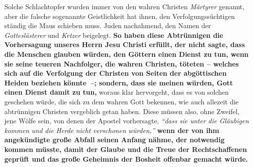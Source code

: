 Solche Schlachtopfer wurden immer von den wahren Christen
\textit{Märtyrer} genannt,
aber die falsche sogenannte Geistlichkeit
hat ihnen, den Verfolgungssüchtigen
ständig die Maus schieben muss.
Juden nachahmend, den Namen der
\textit{Gotteslästerer} und
\textit{Ketzer} beigelegt.  \label{ref:07_16_vervolgung}
\textbf{So haben diese Abtrünnigen die Vorhersagung
unseres Herrn Jesu Christi erfüllt, der nicht sagte, dass die Menschen glauben
würden, den Göttern einen Dienst zu tun, wenn sie seine teueren Nachfolger, die
wahren Christen, töteten
-- welches sich auf die Verfolgung der Christen von Seiten der abgöttischen
Heiden beziehen könnte~--; sondern, dass sie meinen
würden, Gott einen Dienst
damit zu tun,}
woraus klar hervorgeht, dass es von solchen
geschehen würde, die sich zu dem wahren Gott bekennen, wie auch allezeit die
abtrünnigen Christen vergeblich getan haben. Diese müssen also, ohne Zweifel,
jene Wölfe sein, von denen der Apostel vorhersagte,
\textit{"`dass sie unter die
Gläubigen kommen und die Herde nicht verschonen
würden,"'}
\textbf{wenn der von ihm angekündigte große Abfall seinen Anfang nähme, der
notwendig kommen müsste, damit der Glaube und die Treue der
Rechtschaffenen
geprüft und das große Geheimnis der Bosheit offenbar gemacht würde.}

\medskip


